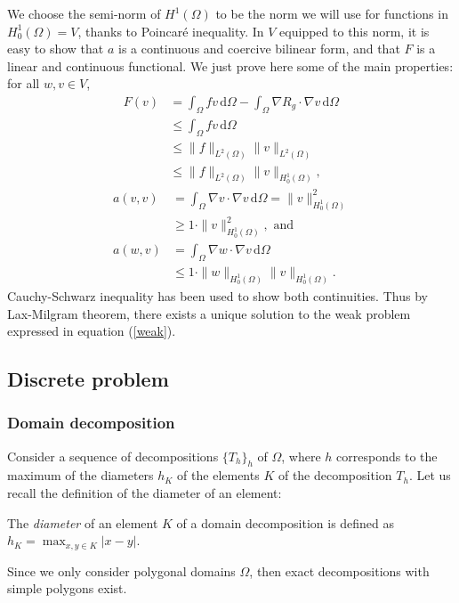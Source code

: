We choose the semi-norm of $H^1(\Omega)$ to be the norm we will use for functions in $H^1_0(\Omega) = V$, thanks to Poincaré inequality. In $V$ equipped to this norm, it is easy to show that $a$ is a continuous and coercive bilinear form, and that $F$ is a linear and continuous functional. We just prove here some of the main properties: for all $w,v\in V$, 
\begin{align*}
F(v) &= \int_\Omega fv \, \mathrm{d}\Omega -\int_\Omega \nabla R_g \cdot \nabla v \, \mathrm{d} \Omega \\
& \leq \int_\Omega fv \, \mathrm{d}\Omega \\
& \leq \|f\|_{L^2(\Omega)}\|v\|_{L^2(\Omega)}\\
& \leq \|f\|_{L^2(\Omega)}\|v\|_{H_0^1(\Omega)},
\end{align*}
\begin{align*}
a(v,v) &= \int_\Omega \nabla v \cdot \nabla v \, \mathrm{d} \Omega = \|v\|^2_{H_0^1(\Omega)}\\
& \geq 1\cdot \|v\|^2_{H_0^1(\Omega)}, \text{ and }\\
a(w,v) &= \int_\Omega \nabla w \cdot \nabla v \, \mathrm{d} \Omega \\
& \leq 1 \cdot \|w\|_{H_0^1(\Omega)}\|v\|_{H_0^1(\Omega)}.
\end{align*} 
Cauchy-Schwarz inequality has been used to show both continuities. Thus by Lax-Milgram theorem, there exists a unique solution to the weak problem expressed in equation (\ref{weak}). 


\subsection{Discrete problem}

\subsubsection{Domain decomposition}
Consider a sequence of decompositions $\{T_h\}_h$ of $\Omega$, where $h$ corresponds to the maximum of the diameters $h_K$ of the elements $K$ of the decomposition $T_h$. Let us recall the definition of the diameter of an element: 

\begin{definition}[Diameter]
The \textit{diameter} of an element $K$ of a domain decomposition is defined as $h_K = \max_{x,y\in K}|x-y|$. 
\end{definition}

\noindent Since we only consider polygonal domains $\Omega$, then exact decompositions with simple polygons exist. 

